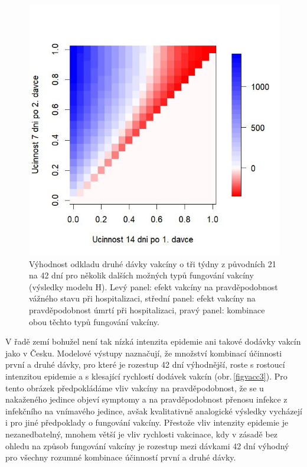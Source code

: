 \begin{figure}[h]
\begin{center}
\begin{minipage}[m]{0.3\linewidth}
		\end{minipage}
		\begin{minipage}[m]{0.3\linewidth}
			\includegraphics[width=\textwidth]{pic/JDL_DIFF_mean_T.jpg}
		\end{minipage}
	\end{center}
	\caption{Výhodnost odkladu druhé dávky vakcíny o tři týdny z původních 21 na 42 dní pro několik dalších možných typů fungování vakcíny (výsledky modelu H). Levý panel: efekt vakcíny na pravděpodobnost vážného stavu při hospitalizaci, střední panel: efekt vakcíny na pravděpodobnost úmrtí při hospitalizaci, pravý panel: kombinace obou těchto typů fungování vakcíny.}
	\label{figvacc2}
\end{figure}

V řadě zemí bohužel není tak nízká intenzita epidemie ani takové dodávky vakcín jako v Česku. Modelové výstupy naznačují, že množství kombinací účinnosti první a druhé dávky, pro které je rozestup 42 dní výhodnější, roste s rostoucí intenzitou epidemie a s klesající rychlostí dodávek vakcín (obr.\,\ref{figvacc3}). Pro tento obrázek předpokládáme vliv vakcíny na pravděpodobnost, že se u nakaženého jedince objeví symptomy a na pravděpodobnost přenosu infekce z infekčního na vnímavého jedince, avšak kvalitativně analogické výsledky vycházejí i pro jiné předpoklady o fungování vakcíny. Přestože vliv intenzity epidemie je nezanedbatelný, mnohem větší je vliv rychlosti vakcinace, kdy v zásadě bez ohledu na způsob fungování vakcíny je rozestup mezi dávkami 42 dní výhodný pro všechny rozumné kombinace účinností první a druhé dávky.

